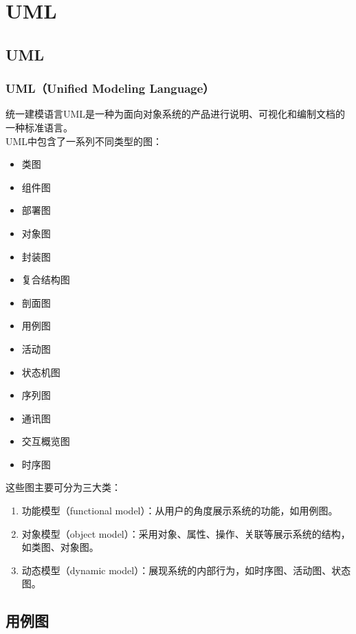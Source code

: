 \chapter{UML}

\section{UML}

\subsection{UML（Unified Modeling Language）}

统一建模语言UML是一种为面向对象系统的产品进行说明、可视化和编制文档的一种标准语言。\\

UML中包含了一系列不同类型的图：

\begin{itemize}
    \item 类图
    \item 组件图
    \item 部署图
    \item 对象图
    \item 封装图
    \item 复合结构图
    \item 剖面图
    \item 用例图
    \item 活动图
    \item 状态机图
    \item 序列图
    \item 通讯图
    \item 交互概览图
    \item 时序图
\end{itemize}

这些图主要可分为三大类：

\begin{enumerate}
    \item 功能模型（functional model）：从用户的角度展示系统的功能，如用例图。
    \item 对象模型（object model）：采用对象、属性、操作、关联等展示系统的结构，如类图、对象图。
    \item 动态模型（dynamic model）：展现系统的内部行为，如时序图、活动图、状态图。
\end{enumerate}

\newpage

\section{用例图}

